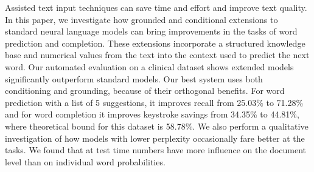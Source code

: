 Assisted text input techniques can save time and effort and improve text quality. In this paper, we investigate how grounded and conditional extensions to standard neural language models can bring improvements in the tasks of word prediction and completion. These extensions incorporate a structured knowledge base and numerical values from the text into the context used to predict the next word. Our automated evaluation on a clinical dataset shows extended models significantly outperform standard models. Our best system uses both conditioning and grounding, because of their orthogonal benefits. For word prediction with a list of 5 suggestions, it improves recall from 25.03\% to 71.28\%  and for word completion it improves keystroke savings from 34.35\% to 44.81\%, where theoretical bound for this dataset is 58.78\%. We also perform a qualitative investigation of how models with lower perplexity occasionally fare better at the tasks. We found that at test time numbers have more influence on the document level than on individual word probabilities.
